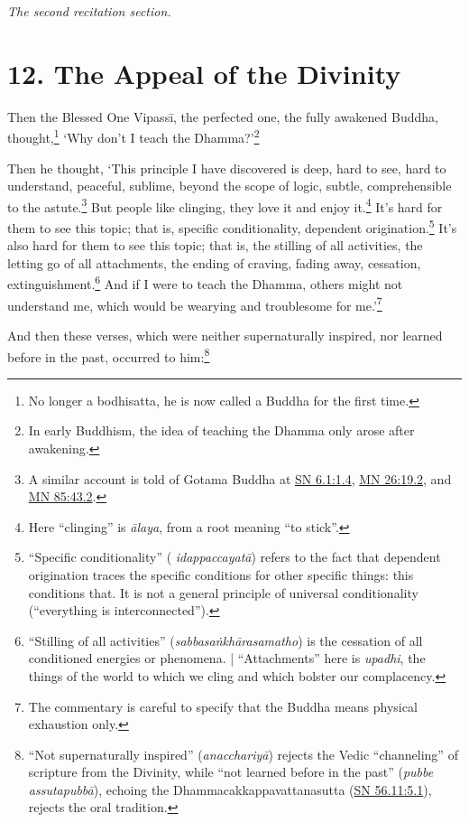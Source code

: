 \documentclass[12pt,openany]{book}%
\newcommand*{\scendsection}[1]{\begin{Center}\begin{small}\textit{#1}\end{small}\end{Center}\addvspace{1em}}
\begin{document}
\scendsection{The second recitation section. }

\section*{12. The Appeal of the Divinity }

Then the Blessed One \textsanskrit{Vipassī}, the perfected one, the fully awakened Buddha, thought,\footnote{No longer a bodhisatta, he is now called a Buddha for the first time. } ‘Why don’t I teach the Dhamma?’\footnote{In early Buddhism, the idea of teaching the Dhamma only arose after awakening. } 

Then he thought, ‘This principle I have discovered is deep, hard to see, hard to understand, peaceful, sublime, beyond the scope of logic, subtle, comprehensible to the astute.\footnote{A similar account is told of Gotama Buddha at \href{https://suttacentral.net/sn6.1/en/sujato\#1.4}{SN 6.1:1.4}, \href{https://suttacentral.net/mn26/en/sujato\#19.2}{MN 26:19.2}, and \href{https://suttacentral.net/mn85/en/sujato\#43.2}{MN 85:43.2}. } But people like clinging, they love it and enjoy it.\footnote{Here “clinging” is \textit{\textsanskrit{ālaya}}, from a root meaning “to stick”. } It’s hard for them to see this topic; that is, specific conditionality, dependent origination.\footnote{“Specific conditionality” (\textit{ \textsanskrit{idappaccayatā}}) refers to the fact that dependent origination traces the specific conditions for other specific things: this conditions that. It is not a general principle of universal conditionality (“everything is interconnected”). } It’s also hard for them to see this topic; that is, the stilling of all activities, the letting go of all attachments, the ending of craving, fading away, cessation, extinguishment.\footnote{“Stilling of all activities” (\textit{\textsanskrit{sabbasaṅkhārasamatho}}) is the cessation of all conditioned energies or phenomena. | “Attachments” here is \textit{upadhi}, the things of the world to which we cling and which bolster our complacency. } And if I were to teach the Dhamma, others might not understand me, which would be wearying and troublesome for me.’\footnote{The commentary is careful to specify that the Buddha means physical exhaustion only. } 

And then these verses, which were neither supernaturally inspired, nor learned before in the past, occurred to him:\footnote{“Not supernaturally inspired” (\textit{\textsanskrit{anacchariyā}}) rejects the Vedic “channeling” of scripture from the Divinity, while “not learned before in the past” (\textit{pubbe \textsanskrit{assutapubbā}}), echoing the Dhammacakkappavattanasutta (\href{https://suttacentral.net/sn56.11/en/sujato\#5.1}{SN 56.11:5.1}), rejects the oral tradition. } 
\end{document}
